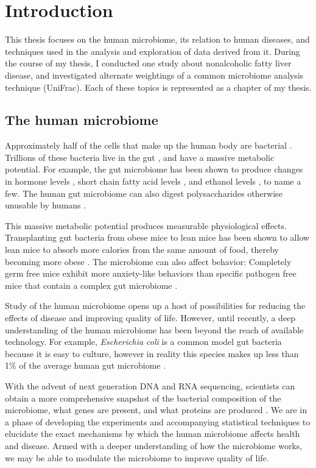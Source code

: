 \chapter{Introduction}
This thesis focuses on the human microbiome, its relation to human diseases, and techniques used in the analysis and exploration of data derived from it. During the course of my thesis, I conducted one study about nonalcoholic fatty liver disease, and investigated alternate weightings of a common microbiome analysis technique (UniFrac). Each of these topics is represented as a chapter of my thesis.

\section{The human microbiome}
Approximately half of the cells that make up the human body are bacterial \cite{sender2016revised}. Trillions of these bacteria live in the gut \cite{guarner2003gut}, and have a massive metabolic potential. For example, the gut microbiome has been shown to produce changes in hormone levels \cite{markle2013sex}, short chain fatty acid levels \cite{turnbaugh2008diet}, and ethanol levels \cite{krebs1970physiological}, to name a few. The human gut microbiome can also digest polysaccharides otherwise unusable by humans \cite{flint2008polysaccharide}.

This massive metabolic potential produces measurable physiological effects. Transplanting gut bacteria from obese mice to lean mice has been shown to allow lean mice to absorb more calories from the same amount of food, thereby becoming more obese \cite{turnbaugh2006obesity}. The microbiome can also affect behavior: Completely germ free mice exhibit more anxiety-like behaviors than specific pathogen free mice that contain a complex gut microbiome \cite{neufeld2011reduced}.

Study of the human microbiome opens up a host of possibilities for reducing the effects of disease and improving quality of life. However, until recently, a deep understanding of the human microbiome has been beyond the reach of available technology. For example, \textit{Escherichia coli} is a common model gut bacteria because it is easy to culture, however in reality this species makes up less than 1\% of the average human gut microbiome \cite{arumugam2011enterotypes}.

With the advent of next generation DNA and RNA sequencing, scientists can obtain a more comprehensive snapshot of the bacterial composition of the microbiome, what genes are present, and what proteins are produced \cite{di2013high}. We are in a phase of developing the experiments and accompanying statistical techniques to elucidate the exact mechanisms by which the human microbiome affects health and disease. Armed with a deeper understanding of how the microbiome works, we may be able to modulate the microbiome to improve quality of life.

